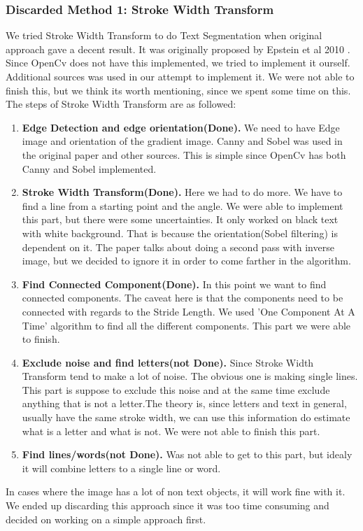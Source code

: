 \documentclass[Report.tex]{subfiles}
\begin{document}
\begin{flushleft}
  \subsubsection{Discarded Method 1: Stroke Width Transform}
  We tried Stroke Width Transform to do Text Segmentation when original approach gave a decent result. It was originally proposed by Epstein et al 2010 \cite{epshtein_stroke_2010}. Since OpenCv does not have this implemented, we tried to implement it ourself. Additional sources was used in our attempt to implement it\cite{werner_text_????, _c++_????, bunn_strokewidthtransform:_2018}. We were not able to finish this, but we think its worth mentioning, since we spent some time on this. The steps of Stroke Width Transform are as followed:
  \begin{enumerate}
    \item \textbf{Edge Detection and edge orientation(Done).}
    We need to have Edge image and orientation of the gradient image.
    Canny and Sobel was used in the original paper and other sources. This is simple since OpenCv has both Canny and Sobel implemented.
    \item \textbf{Stroke Width Transform(Done).}
    Here we had to do more. We have to find a line from a starting point and the angle. We were able to implement this part, but there were some uncertainties. It only worked on black text with white background. That is because the orientation(Sobel filtering) is dependent on it. The paper talks about doing a second pass with inverse image, but we decided to ignore it in order to come farther in the algorithm.
    \item \textbf{Find Connected Component(Done).}
    In this point we want to find connected components. The caveat here is that the components need to be connected with regards to the Stride Length. We used 'One Component At A Time' algorithm to find all the different components. This part we were able to finish.
    \item \textbf{Exclude noise and find letters(not Done).}
    Since Stroke Width Transform tend to make a lot of noise. The obvious one is making single lines. This part is suppose to exclude this noise and at the same time exclude anything that is not a letter.The theory is, since letters and text in general, usually have the same stroke width, we can use this information do estimate what is a letter and what is not. We were not able to finish this part.
    \item \textbf{Find lines/words(not Done).}
    Was not able to get to this part, but idealy it will combine letters to a single line or word.
  \end{enumerate}
  In cases where the image has a lot of non text objects, it will work fine with it. We ended up discarding this approach since it was too time consuming and decided on working on a simple approach first.
\end{flushleft}
\end{document}
